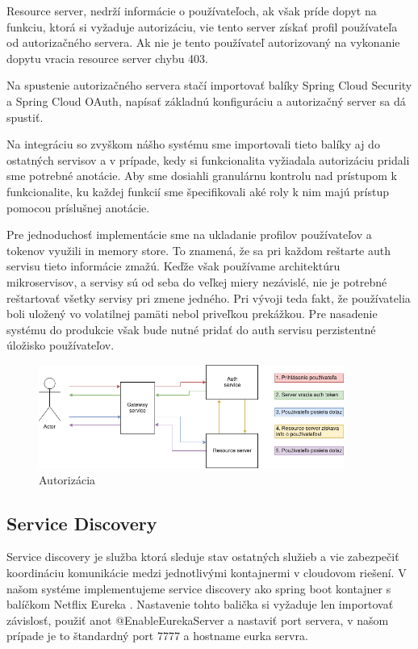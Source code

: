 Resource server, nedrží informácie o používateľoch, ak však príde dopyt na funkciu, ktorá si vyžaduje autorizáciu, vie tento server získať profil používateľa od autorizačného servera. Ak nie je tento používateľ autorizovaný na vykonanie dopytu vracia resource server chybu 403. 

Na spustenie autorizačného servera stačí importovať balíky  Spring Cloud Security a Spring Cloud OAuth, napísať základnú konfiguráciu a autorizačný server sa dá spustiť.   

Na integráciu so zvyškom nášho systému sme importovali tieto balíky aj do ostatných servisov a v prípade, kedy si funkcionalita vyžiadala autorizáciu  pridali sme potrebné anotácie. Aby sme dosiahli granulárnu kontrolu nad prístupom k funkcionalite, ku každej funkcií sme špecifikovali aké roly k nim majú prístup pomocou príslušnej anotácie.  

Pre jednoduchosť implementácie sme na ukladanie profilov používateľov a tokenov využili in memory store. To znamená, že sa pri každom reštarte auth servisu tieto informácie zmažú. Keďže však používame architektúru mikroservisov, a servisy sú od seba do veľkej miery nezávislé, nie je potrebné reštartovať všetky servisy pri zmene jedného. Pri vývoji teda fakt, že používatelia boli uložený vo volatilnej pamäti nebol priveľkou prekážkou. Pre nasadenie systému do produkcie však bude nutné pridať do auth servisu perzistentné úložisko používateľov.   


\begin{figure}[!htbp] 
	\centering 
	\includegraphics[width=10cm]{img/auth_operation.png} 
	\caption{Autorizácia} 
	\label{auth_operation} 
\end{figure}  

\subsection{Service Discovery}
Service discovery je služba ktorá sleduje stav ostatných služieb a vie zabezpečiť koordináciu komunikácie medzi jednotlivými kontajnermi v cloudovom riešení. V našom systéme implementujeme service discovery ako spring boot kontajner s balíčkom Netflix Eureka \cite{eureka}. Nastavenie tohto balička si vyžaduje len importovať závislosť, použiť anot @EnableEurekaServer a nastaviť port servera, v našom prípade je to štandardný port 7777 a hostname eurka servra. 

